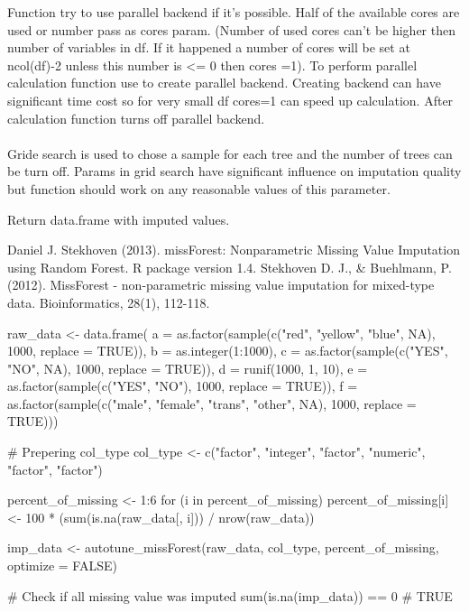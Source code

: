 \documentclass[letterpaper]{book}
\begin{document}
%
\begin{Details}\relax
Function try to use parallel backend if it's possible. Half of the available cores are used or number pass as cores param. (Number of used cores can't be higher then number of variables in df. If it happened a number of cores will be set at ncol(df)-2 unless this number is <= 0 then cores =1).  To perform parallel calculation function use   to create parallel backend.
Creating backend can have significant time cost so for very small df cores=1 can speed up calculation. After calculation function turns off parallel backend. \\{} \\{}   Gride search is used to chose a sample for each tree and the number of trees can be turn off. Params in grid search have significant influence on imputation quality but function should work on any reasonable values of this parameter.
\end{Details}
%
\begin{Value}
Return data.frame with imputed values.
\end{Value}
%
\begin{References}\relax
Daniel J. Stekhoven (2013). missForest: Nonparametric Missing Value Imputation using Random Forest. R package version 1.4.
Stekhoven D. J., \& Buehlmann, P. (2012). MissForest - non-parametric missing value imputation for mixed-type data. Bioinformatics, 28(1), 112-118.
\end{References}
%
\begin{Examples}
\begin{ExampleCode}
{
  raw_data <- data.frame(
    a = as.factor(sample(c("red", "yellow", "blue", NA), 1000, replace = TRUE)),
    b = as.integer(1:1000),
    c = as.factor(sample(c("YES", "NO", NA), 1000, replace = TRUE)),
    d = runif(1000, 1, 10),
    e = as.factor(sample(c("YES", "NO"), 1000, replace = TRUE)),
    f = as.factor(sample(c("male", "female", "trans", "other", NA), 1000, replace = TRUE)))

  # Prepering col_type
  col_type <- c("factor", "integer", "factor", "numeric", "factor", "factor")

  percent_of_missing <- 1:6
  for (i in percent_of_missing) {
    percent_of_missing[i] <- 100 * (sum(is.na(raw_data[, i])) / nrow(raw_data))
  }


  imp_data <- autotune_missForest(raw_data, col_type, percent_of_missing, optimize = FALSE)

  # Check if all missing value was imputed
  sum(is.na(imp_data)) == 0
  # TRUE
}
\end{ExampleCode}
\end{Examples}
\end{document}
